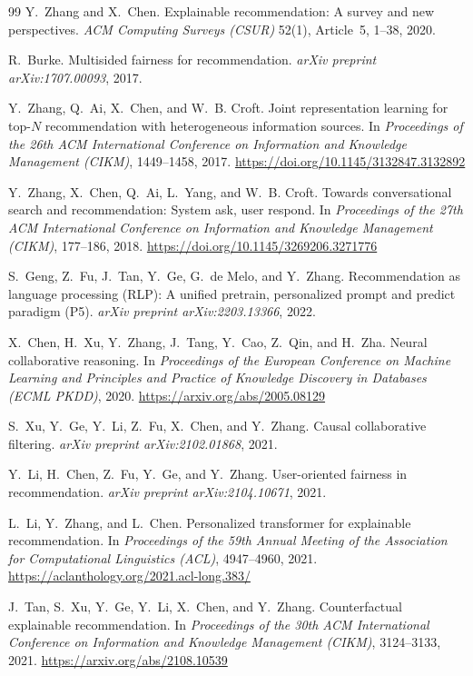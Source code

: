 \documentclass[sigconf,nonacm]{acmart}
\begin{document}
\begin{thebibliography}{99}
Y.~Zhang and X.~Chen.
\newblock Explainable recommendation: A survey and new perspectives.
\newblock \emph{ACM Computing Surveys (CSUR)} 52(1), Article~5, 1--38, 2020.

R.~Burke.
\newblock Multisided fairness for recommendation.
\newblock \emph{arXiv preprint arXiv:1707.00093}, 2017.

Y.~Zhang, Q.~Ai, X.~Chen, and W.~B. Croft.
\newblock Joint representation learning for top-$N$ recommendation with heterogeneous information sources.
\newblock In \emph{Proceedings of the 26th ACM International Conference on Information and Knowledge Management (CIKM)}, 1449--1458, 2017.
\newblock \url{https://doi.org/10.1145/3132847.3132892}

Y.~Zhang, X.~Chen, Q.~Ai, L.~Yang, and W.~B. Croft.
\newblock Towards conversational search and recommendation: System ask, user respond.
\newblock In \emph{Proceedings of the 27th ACM International Conference on Information and Knowledge Management (CIKM)}, 177--186, 2018.
\newblock \url{https://doi.org/10.1145/3269206.3271776}

S.~Geng, Z.~Fu, J.~Tan, Y.~Ge, G.~de Melo, and Y.~Zhang.
\newblock Recommendation as language processing (RLP): A unified pretrain, personalized prompt and predict paradigm (P5).
\newblock \emph{arXiv preprint arXiv:2203.13366}, 2022.

X.~Chen, H.~Xu, Y.~Zhang, J.~Tang, Y.~Cao, Z.~Qin, and H.~Zha.
\newblock Neural collaborative reasoning.
\newblock In \emph{Proceedings of the European Conference on Machine Learning and Principles and Practice of Knowledge Discovery in Databases (ECML PKDD)}, 2020.
\newblock \url{https://arxiv.org/abs/2005.08129}

S.~Xu, Y.~Ge, Y.~Li, Z.~Fu, X.~Chen, and Y.~Zhang.
\newblock Causal collaborative filtering.
\newblock \emph{arXiv preprint arXiv:2102.01868}, 2021.

Y.~Li, H.~Chen, Z.~Fu, Y.~Ge, and Y.~Zhang.
\newblock User-oriented fairness in recommendation.
\newblock \emph{arXiv preprint arXiv:2104.10671}, 2021.

L.~Li, Y.~Zhang, and L.~Chen.
\newblock Personalized transformer for explainable recommendation.
\newblock In \emph{Proceedings of the 59th Annual Meeting of the Association for Computational Linguistics (ACL)}, 4947--4960, 2021.
\newblock \url{https://aclanthology.org/2021.acl-long.383/}

J.~Tan, S.~Xu, Y.~Ge, Y.~Li, X.~Chen, and Y.~Zhang.
\newblock Counterfactual explainable recommendation.
\newblock In \emph{Proceedings of the 30th ACM International Conference on Information and Knowledge Management (CIKM)}, 3124--3133, 2021.
\newblock \url{https://arxiv.org/abs/2108.10539}

\end{thebibliography}
\end{document}
